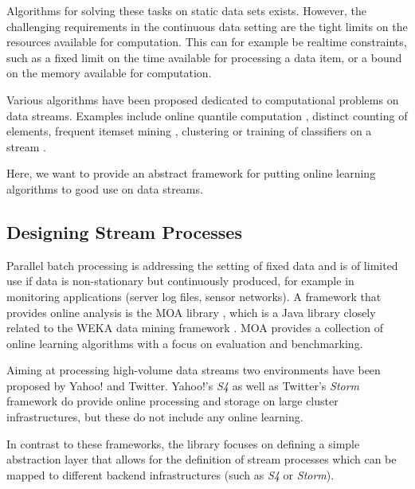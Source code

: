 Algorithms for solving these tasks on static data sets
exists. However, the challenging requirements in the continuous data
setting are the tight limits on the resources available for
computation. This can for example be realtime constraints, such as a
fixed limit on the time available for processing a data item, or a
bound on the memory available for computation.

Various algorithms have been proposed dedicated to computational
problems on data streams. Examples include online quantile computation
\cite{Greenwald/Khanna/2001a,Arasu/Manku/2004a}, distinct counting of
elements, frequent itemset mining
\cite{Charikar02findingfrequent,goethals2007,Cheng06maintainingfrequent},
clustering \cite{sohler2010,Aggarwal:2003} or training of classifiers
on a stream \cite{Domingos/Hulten/2000a}.

Here, we want to provide an abstract framework for putting online
learning algorithms to good use on data streams.

\subsection{Designing Stream Processes}

Parallel batch processing is addressing the setting of fixed data and
is of limited use if data is non-stationary but continuously produced,
for example in monitoring applications (server log files, sensor
networks).  A framework that provides online analysis is the MOA
library \cite{moa}, which is a Java library closely related to the
WEKA data mining framework \cite{weka}. MOA provides a collection of
online learning algorithms with a focus on evaluation and
benchmarking.

Aiming at processing high-volume data streams two environments have
been proposed by Yahoo! and Twitter. Yahoo!'s {\em S4} \cite{s4io}
as well as Twitter's {\em Storm} \cite{storm} framework do provide
online processing and storage on large cluster infrastructures, but
these do not include any online learning.

In contrast to these frameworks, the \streams library focuses on
defining a simple abstraction layer that allows for the definition of
stream processes which can be mapped to different backend
infrastructures (such as {\em S4} or {\em Storm}).

